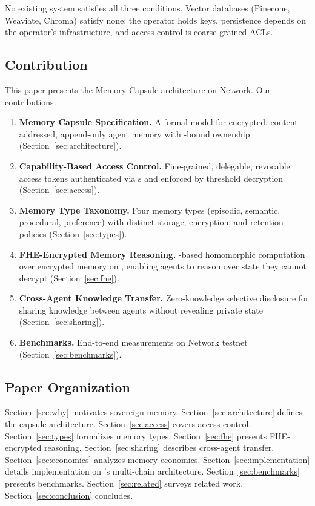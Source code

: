 No existing system satisfies all three conditions. Vector databases (Pinecone, Weaviate, Chroma) satisfy none: the operator holds keys, persistence depends on the operator's infrastructure, and access control is coarse-grained ACLs.

\subsection{Contribution}

This paper presents the Memory Capsule architecture on \Zoo{} Network. Our contributions:

\begin{enumerate}
    \item \textbf{Memory Capsule Specification.} A formal model for encrypted, content-addressed, append-only agent memory with \DID{}-bound ownership (Section~\ref{sec:architecture}).
    \item \textbf{Capability-Based Access Control.} Fine-grained, delegable, revocable access tokens authenticated via \IChain{} \DID{}s and enforced by \TChain{} threshold decryption (Section~\ref{sec:access}).
    \item \textbf{Memory Type Taxonomy.} Four memory types (episodic, semantic, procedural, preference) with distinct storage, encryption, and retention policies (Section~\ref{sec:types}).
    \item \textbf{FHE-Encrypted Memory Reasoning.} \CKKS{}-based homomorphic computation over encrypted memory on \AChain{}, enabling agents to reason over state they cannot decrypt (Section~\ref{sec:fhe}).
    \item \textbf{Cross-Agent Knowledge Transfer.} Zero-knowledge selective disclosure for sharing knowledge between agents without revealing private state (Section~\ref{sec:sharing}).
    \item \textbf{Benchmarks.} End-to-end measurements on \Zoo{} Network testnet (Section~\ref{sec:benchmarks}).
\end{enumerate}

\subsection{Paper Organization}

Section~\ref{sec:why} motivates sovereign memory. Section~\ref{sec:architecture} defines the capsule architecture. Section~\ref{sec:access} covers access control. Section~\ref{sec:types} formalizes memory types. Section~\ref{sec:fhe} presents FHE-encrypted reasoning. Section~\ref{sec:sharing} describes cross-agent transfer. Section~\ref{sec:economics} analyzes memory economics. Section~\ref{sec:implementation} details implementation on \Zoo{}'s multi-chain architecture. Section~\ref{sec:benchmarks} presents benchmarks. Section~\ref{sec:related} surveys related work. Section~\ref{sec:conclusion} concludes.

